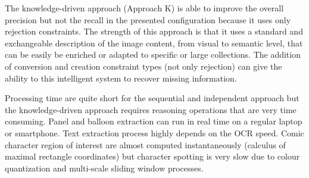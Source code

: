 The knowledge-driven approach (Approach K) is able to improve the overall precision but not the recall in the presented configuration because it uses only rejection constraints.
The strength of this approach is that it uses a standard and exchangeable description of the image content, from visual to semantic level, that can be easily be enriched or adapted to specific or large collections.
The addition of conversion and creation constraint types (not only rejection) can give the ability to this intelligent system to recover missing information.

Processing time are quite short for the sequential and independent approach but the knowledge-driven approach requires reasoning operations that are very time consuming.
Panel and balloon extraction can run in real time on a regular laptop or smartphone.
Text extraction process highly depends on the OCR speed.
Comic character region of interest are almost computed instantaneously (calculus of maximal rectangle coordinates) but character spotting is very slow due to colour quantization and multi-scale sliding window processes.


